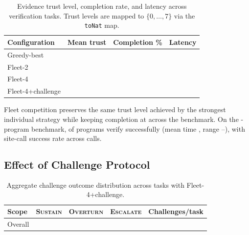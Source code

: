 \documentclass[11pt]{article}
\providecommand{\ESCALATE}{\textsc{Escalate}}
\providecommand{\SUSTAIN}{\textsc{Sustain}}
\providecommand{\OVERTURN}{\textsc{Overturn}}
\begin{document}
\begin{table}[H]
\centering
\caption{Evidence trust level, completion rate, and latency
  across \numcases{} verification tasks.  Trust levels are mapped to
  $\{0,\ldots,7\}$ via the \texttt{toNat} map.}
\label{tab:results}
\begin{tabular}{lccc}
\toprule
\textbf{Configuration} & \textbf{Mean trust} &
  \textbf{Completion \%} & \textbf{Latency} \\
\midrule
Greedy-best          & \ppSeventeenGreedyMeanTrust{} & \ppSeventeenGreedyCompletionRate{} & \ppSeventeenGreedyLatency{} \\
Fleet-2              & \ppSeventeenFleetTwoMeanTrust{} & \ppSeventeenFleetTwoCompletionRate{} & \ppSeventeenFleetTwoLatency{} \\
Fleet-4              & \ppSeventeenFleetThreeMeanTrust{} & \ppSeventeenFleetCompletionRate{} & \ppSeventeenFleetFourLatency{} \\
Fleet-4+challenge    & \ppSeventeenFleetFourChallengeMeanTrust{} & \ppSeventeenFleetCompletionRate{} & \ppSeventeenFleetFourChallengeLatency{} \\
\bottomrule
\end{tabular}
\end{table}

Fleet competition preserves the same trust level achieved by the strongest
individual strategy while keeping completion at \ppSeventeenFleetCompletionRate{}
across the benchmark.  On the \expTotalPrograms-program benchmark,
\expAccuracy{} of programs verify successfully (mean time \expTimeMean,
range \expTimeMin--\expTimeMax), with \subSiteSuccessRate{} site-call
success rate across \subSiteCalls{} calls.

\subsection{Effect of Challenge Protocol}

\begin{table}[H]
\centering
\caption{Aggregate challenge outcome distribution across \numcases{} tasks with
  Fleet-4+challenge.}
\label{tab:challenges}
\begin{tabular}{lcccc}
\toprule
\textbf{Scope} & \SUSTAIN{} & \OVERTURN{} & \ESCALATE{} &
  \textbf{Challenges/task} \\
\midrule
Overall & \ppSeventeenSustainRate{} & \ppSeventeenOverturnRate{} & \ppSeventeenEscalateRate{} & \ppSeventeenChallengesPerTask{} \\
\bottomrule
\end{tabular}
\end{table}
\end{document}
